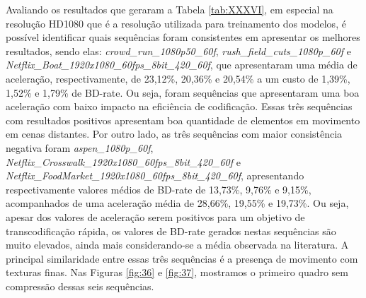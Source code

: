 Avaliando os resultados que geraram a Tabela \ref{tab:XXXVI}, em especial na resolução HD1080 que é a resolução utilizada para treinamento dos modelos, é possível identificar quais sequências foram consistentes em apresentar os melhores resultados, sendo elas: \textit{crowd\_run\_1080p50\_60f}, \textit{rush\_field\_cuts\_1080p\_60f} e \textit{Netflix\_Boat\_1920x1080\_60fps\_8bit\_420\_60f}, que apresentaram uma média de aceleração, respectivamente, de 23,12\%, 20,36\% e 20,54\% a um custo de 1,39\%, 1,52\% e 1,79\% de BD-rate. Ou seja, foram sequências que apresentaram uma boa aceleração com baixo impacto na eficiência de codificação. Essas três sequências com resultados positivos apresentam boa quantidade de elementos em movimento em cenas distantes. Por outro lado, as três sequências com maior consistência negativa foram \textit{aspen\_1080p\_60f}, \textit{Netflix\_Crosswalk\_1920x1080\_60fps\_8bit\_420\_60f} e \textit{Netflix\_FoodMarket\_1920x1080\_60fps\_8bit\_420\_60f}, apresentando respectivamente valores médios de BD-rate de 13,73\%, 9,76\% e 9,15\%, acompanhados de uma aceleração média de 28,66\%, 19,55\% e 19,73\%. Ou seja, apesar dos valores de aceleração serem positivos para um objetivo de transcodificação rápida, os valores de BD-rate gerados nestas sequências são muito elevados, ainda mais considerando-se a média observada na literatura. A principal similaridade entre essas três sequências é a presença de movimento com texturas finas. Nas Figuras \ref{fig:36} e \ref{fig:37}, mostramos o primeiro quadro sem compressão dessas seis sequências.

